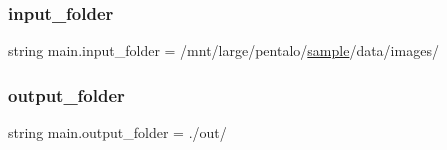 \subsubsection{\texorpdfstring{input\+\_\+folder}{input\_folder}}
{\footnotesize\ttfamily string main.\+input\+\_\+folder = \textquotesingle{}/mnt/large/pentalo/\hyperlink{classsample_generator_1_1sample_1_1sample}{sample}/data/images/\textquotesingle{}}

\mbox{\label{namespacemain_a272479fd8bcaf9c622140557411310ab}} 
\subsubsection{\texorpdfstring{output\+\_\+folder}{output\_folder}}
{\footnotesize\ttfamily string main.\+output\+\_\+folder = \textquotesingle{}./out/\textquotesingle{}}

